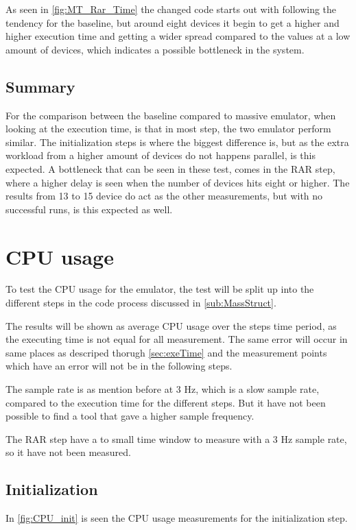 As seen in \autoref{fig:MT_Rar_Time} the changed code starts out with following the tendency for the baseline, but around eight devices it begin to get a higher and higher execution time and getting a wider spread compared to the values at a low amount of devices, which indicates a possible bottleneck in the system.

\subsection{Summary}
For the comparison between the baseline compared to massive emulator, when looking at the execution time, is that in most step, the two emulator perform similar. The initialization steps is where the biggest difference is, but as the extra workload from a higher amount of devices do not happens parallel, is this expected. A bottleneck that can be seen in these test, comes in the RAR step, where a higher delay is seen when the number of devices hits eight or higher. The results from 13 to 15 device do act as the other measurements, but with no successful runs, is this expected as well.


\section{CPU usage}
To test the CPU usage for the emulator, the test will be split up into the different steps in the code process discussed in \autoref{sub:MassStruct}. 

The results will be shown as average CPU usage over the steps time period, as the executing time is not equal for all measurement. The same error will occur in same places as descriped thorugh \autoref{sec:exeTime} and the measurement points which have an error will not be in the following steps.

The sample rate is as mention before at 3 Hz, which is a slow sample rate, compared to the execution time for the different steps. But it have not been possible to find a tool that gave a higher sample frequency.

The RAR step have a to small time window to measure with a 3 Hz sample rate, so it have not been measured.

\subsection{Initialization}
In \autoref{fig:CPU_init} is seen the CPU usage measurements for the initialization step.

